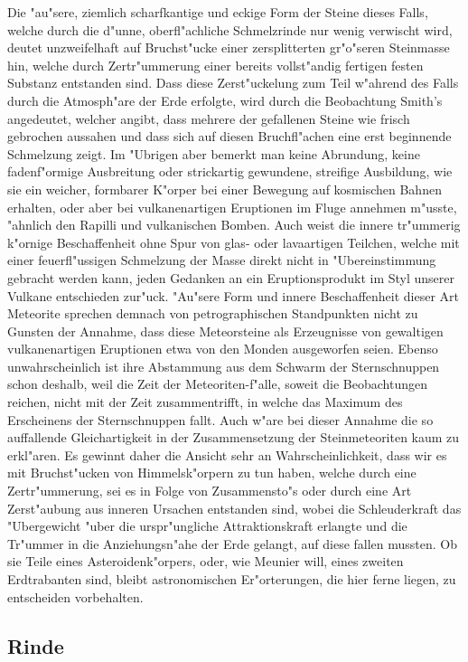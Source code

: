 \documentclass[a4paper, 11pt, oneside]{article}
\begin{document}
Die "au"sere, ziemlich scharfkantige und eckige Form der Steine dieses Falls, welche durch die d"unne, oberfl"achliche Schmelzrinde nur wenig verwischt wird, deutet unzweifelhaft auf Bruchst"ucke einer zersplitterten gr"o"seren Steinmasse hin, welche durch Zertr"ummerung einer bereits vollst"andig fertigen festen Substanz entstanden sind. Dass diese Zerst"uckelung zum Teil w"ahrend des Falls durch die Atmosph"are der Erde erfolgte, wird durch die Beobachtung Smith's angedeutet, welcher angibt, dass mehrere der gefallenen Steine wie frisch gebrochen aussahen und dass sich auf diesen Bruchfl"achen eine erst beginnende Schmelzung zeigt. Im "Ubrigen aber bemerkt man keine Abrundung, keine fadenf"ormige Ausbreitung oder strickartig gewundene, streifige Ausbildung, wie sie ein weicher, formbarer K"orper bei einer Bewegung auf kosmischen Bahnen erhalten, oder aber bei vulkanenartigen Eruptionen im Fluge annehmen m"usste, "ahnlich den Rapilli und vulkanischen Bomben. Auch weist die innere tr"ummerig k"ornige Beschaffenheit ohne Spur von glas- oder lavaartigen Teilchen, welche mit einer feuerfl"ussigen Schmelzung der Masse direkt nicht in "Ubereinstimmung gebracht werden kann, jeden Gedanken an ein Eruptionsprodukt im Styl unserer Vulkane entschieden zur"uck. "Au"sere Form und innere Beschaffenheit dieser Art Meteorite sprechen demnach von petrographischen Standpunkten nicht zu Gunsten der Annahme, dass diese Meteorsteine als Erzeugnisse von gewaltigen vulkanenartigen Eruptionen etwa von den Monden ausgeworfen seien. Ebenso unwahrscheinlich ist ihre Abstammung aus dem Schwarm der Sternschnuppen schon deshalb, weil die Zeit der Meteoriten-f"alle, soweit die Beobachtungen reichen, nicht mit der Zeit zusammentrifft, in welche das Maximum des Erscheinens der Sternschnuppen fallt. Auch w"are bei dieser Annahme die so auffallende Gleichartigkeit in der Zusammensetzung der Steinmeteoriten kaum zu erkl"aren. Es gewinnt daher die Ansicht sehr an Wahrscheinlichkeit, dass wir es mit Bruchst"ucken von Himmelsk"orpern zu tun haben, welche durch eine Zertr"ummerung, sei es in Folge von Zusammensto"s oder durch eine Art Zerst"aubung aus inneren Ursachen entstanden sind, wobei die Schleuderkraft das "Ubergewicht "uber die urspr"ungliche Attraktionskraft erlangte und die Tr"ummer in die Anziehungsn"ahe der Erde gelangt, auf diese fallen mussten. Ob sie Teile eines Asteroidenk"orpers, oder, wie Meunier will, eines zweiten Erdtrabanten sind, bleibt astronomischen Er"orterungen, die hier ferne liegen, zu entscheiden vorbehalten.
\clearpage
\subsection{Rinde}
\end{document}
